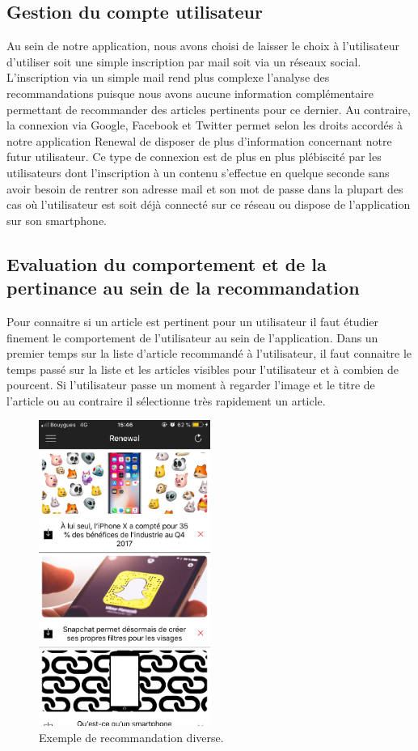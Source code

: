 \subsection{Gestion du compte utilisateur}

Au sein de notre application, nous avons choisi de laisser le choix à l'utilisateur d'utiliser soit une simple inscription par mail soit via un réseaux social. L'inscription via un simple mail rend plus complexe l'analyse des recommandations puisque nous avons aucune information complémentaire permettant de recommander des articles pertinents pour ce dernier. Au contraire, la connexion via Google, Facebook et Twitter permet selon les droits accordés à notre application Renewal de disposer de plus d'information concernant notre futur utilisateur. Ce type de connexion est de plus en plus plébiscité par les utilisateurs dont l'inscription à un contenu s'effectue en quelque seconde sans avoir besoin de rentrer son adresse mail et son mot de passe dans la plupart des cas où l'utilisateur est soit déjà connecté sur ce réseau ou dispose de l'application sur son smartphone.

\subsection{Evaluation du comportement et de la pertinance au sein de la recommandation}

Pour connaitre si un article est pertinent pour un utilisateur il faut étudier finement le comportement de l'utilisateur au sein de l'application. Dans un premier temps sur la liste d'article recommandé à l'utilisateur, il faut connaitre le temps passé sur la liste et les articles visibles pour l'utilisateur et à combien de pourcent. Si l’utilisateur passe un moment à regarder l’image et le titre de l’article ou au contraire il sélectionne très rapidement un article.

\begin{figure}[htp]
  \centering
  \includegraphics[height=10cm]{images/divers}
  \caption{Exemple de recommandation diverse.}
  \label{fig:screen-settings}
\end{figure}


